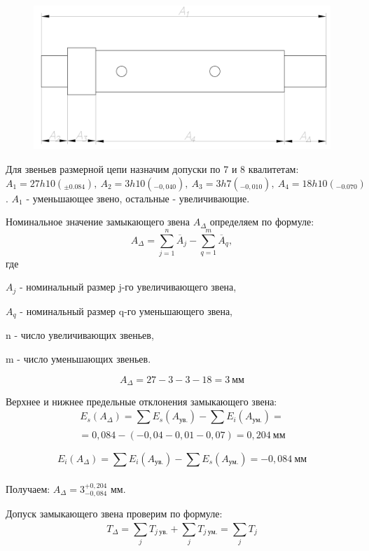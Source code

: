 \documentclass[14pt,a4paper,russian]{scrartcl}
\begin{document}
    \begin{figure}[h]
        \centering
        \includegraphics[width=1\linewidth]{size_chain.png}
        \caption{}
        \label{Размерная цепь}
    \end{figure}
        
        Для звеньев размерной цепи назначим допуски по 7 и 8 квалитетам:
        \( A_1 = 27 h10(_{\pm0.084}),\ A_2 = 3 h10(_{-0,040}),
        \ A_3=3 h7(_{-0,010}),\ A_4=18 h10 (_{-0.070})\).
        \( A_1 \) - уменьшающее звено, остальные - увеличивающие.

        Номинальное значение замыкающего звена \( A_\Delta \) определяем 
        по формуле:
        \[ A_\Delta = \sum_{j=1}^{n}\overline{A}_j - 
            \sum_{q=1}^{m}\overline{A}_q, \]
        где\par
        \qquad \( A_j \) - номинальный размер j-го увеличивающего звена,\par 
        \qquad \( A_q \) - номинальный размер q-го уменьшающего звена,\par
        \qquad n - число увеличивающих звеньев,\par 
        \qquad m - число уменьшающих звеньев.\par
        
        \[ A_\Delta = 27-3-3-18=3\ \text{мм} \]
        

        Верхнее и нижнее предельные отклонения замыкающего звена:
        \[ E_s(A_\Delta) = \sum_{}^{}E_s(A_{\text{ув.}}) - \sum_{}^{}E_i(A_{\text{ум.}}) =\]
        \[ = 0,084 - (-0,04 - 0,01 - 0,07) = 0,204\ \text{мм} \]
        
        \[ E_i(A_\Delta) = \sum_{}^{}E_i(A_{\text{ув.}}) - \sum_{}^{}E_s(A_{\text{ум.}}) = -0,084\ \text{мм}\]
        
        Получаем: \( A_\Delta = 3_{-0,084}^{+0,204} \) мм.
        

        Допуск замыкающего звена проверим по формуле:
        \[ T_\Delta = \sum_{j}^{}T_{j\ \text{ув.}} + \sum_{j}^{}T_{j\ \text{ум.}} = \sum_{j}^{}T_j \]
        
\end{document}
